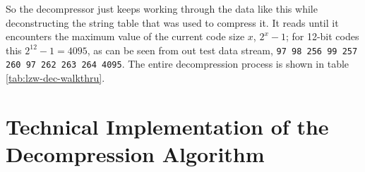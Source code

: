 So the decompressor just keeps working through the data like this while
deconstructing the string table that was used to compress it. It reads
until it encounters the maximum value of the current code size $x$,
$2^{x}-1$; for 12-bit codes this $2^{12} - 1 = 4095$, as can be seen
from out test data stream, \texttt{97 98 256 99 257 260 97 262 263 264
  4095}. The entire decompression process is shown in table \ref{tab:lzw-dec-walkthru}.

\begin{table}
  \centering
  \noindent{}
  \caption{Detailed LZW decompression on the string \texttt{ababcbababaaaaaaa}.}
  \label{tab:lzw-dec-walkthru}
\end{table}

\section{Technical Implementation of the Decompression Algorithm}


